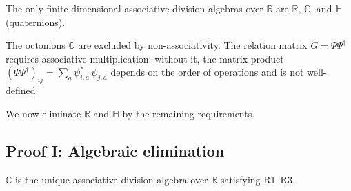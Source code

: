 \begin{theorem}
The only finite-dimensional associative division algebras over $\mathbb{R}$ are $\mathbb{R}$, $\mathbb{C}$, and $\mathbb{H}$ (quaternions).
\end{theorem}

\begin{remark}
The octonions $\mathbb{O}$ are excluded by non-associativity. The relation matrix $G = \Psi\Psi^\dagger$ requires associative multiplication; without it, the matrix product $(\Psi\Psi^\dagger)_{ij} = \sum_a \psi^*_{i,a}\,\psi_{j,a}$ depends on the order of operations and is not well-defined.
\end{remark}

We now eliminate $\mathbb{R}$ and $\mathbb{H}$ by the remaining requirements.

\subsection{Proof I: Algebraic elimination}

\begin{theorem}
\label{thm:C_algebra}
$\mathbb{C}$ is the unique associative division algebra over $\mathbb{R}$ satisfying R1--R3.
\end{theorem}

